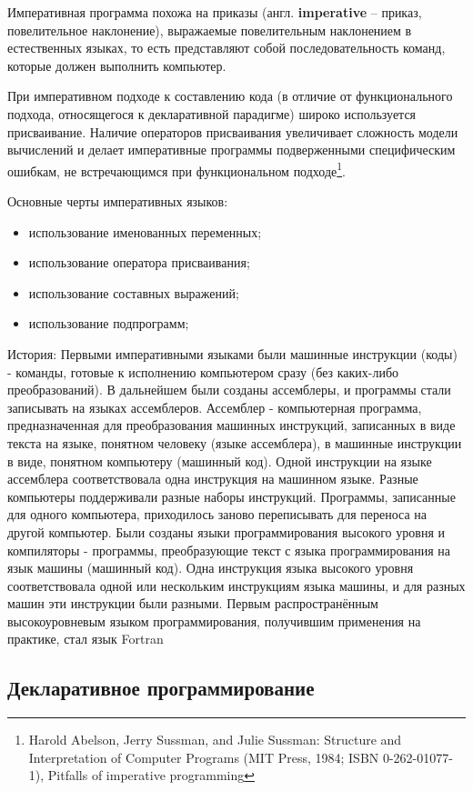\documentclass[12pt, twoside]{report}
\begin{document}
Императивная программа похожа на приказы (англ. \textbf{imperative} -- приказ, повелительное наклонение), выражаемые повелительным наклонением в естественных языках, то есть представляют собой последовательность команд, которые должен выполнить компьютер.

При императивном подходе к составлению кода (в отличие от функционального подхода, относящегося к декларативной парадигме) широко используется присваивание. Наличие операторов присваивания увеличивает сложность модели вычислений и делает императивные программы подверженными специфическим ошибкам, не встречающимся при функциональном подходе\footnote{Harold Abelson, Jerry Sussman, and Julie Sussman: Structure and Interpretation of Computer Programs (MIT Press, 1984; ISBN 0-262-01077-1), Pitfalls of imperative programming}.

Основные черты императивных языков:
\begin{itemize}
  \item использование именованных переменных;
  \item использование оператора присваивания;
  \item использование составных выражений;
  \item использование подпрограмм;
\end{itemize}

История:
Первыми императивными языками были машинные инструкции (коды) - команды, готовые к исполнению компьютером сразу (без каких-либо преобразований). В дальнейшем были созданы ассемблеры, и программы стали записывать на языках ассемблеров. Ассемблер - компьютерная программа, предназначенная для преобразования машинных инструкций, записанных в виде текста на языке, понятном человеку (языке ассемблера), в машинные инструкции в виде, понятном компьютеру (машинный код). Одной инструкции на языке ассемблера соответствовала одна инструкция на машинном языке. Разные компьютеры поддерживали разные наборы инструкций. Программы, записанные для одного компьютера, приходилось заново переписывать для переноса на другой компьютер. Были созданы языки программирования высокого уровня и компиляторы - программы, преобразующие текст с языка программирования на язык машины (машинный код). Одна инструкция языка высокого уровня соответствовала одной или нескольким инструкциям языка машины, и для разных машин эти инструкции были разными. Первым распространённым высокоуровневым языком программирования, получившим применения на практике, стал язык Fortran

\subsection*{Декларативное программирование}
\end{document}
